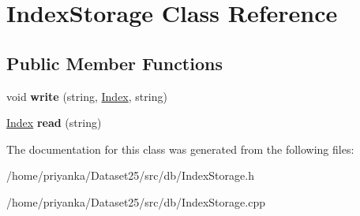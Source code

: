 \hypertarget{classIndexStorage}{\section{\-Index\-Storage \-Class \-Reference}
\label{classIndexStorage}
}
\subsection*{\-Public \-Member \-Functions}
\begin{DoxyCompactItemize}
\item 
\hypertarget{classIndexStorage_a6bae45234b690eb9ffca45b3033de28a}{void {\bfseries write} (string, \hyperlink{classIndex}{\-Index}, string)}\label{classIndexStorage_a6bae45234b690eb9ffca45b3033de28a}

\item 
\hypertarget{classIndexStorage_adfb66513f7c684d6df29d73f92f62a9c}{\hyperlink{classIndex}{\-Index} {\bfseries read} (string)}\label{classIndexStorage_adfb66513f7c684d6df29d73f92f62a9c}

\end{DoxyCompactItemize}


\-The documentation for this class was generated from the following files\-:\begin{DoxyCompactItemize}
\item 
/home/priyanka/\-Dataset25/src/db/\-Index\-Storage.\-h\item 
/home/priyanka/\-Dataset25/src/db/\-Index\-Storage.\-cpp\end{DoxyCompactItemize}
